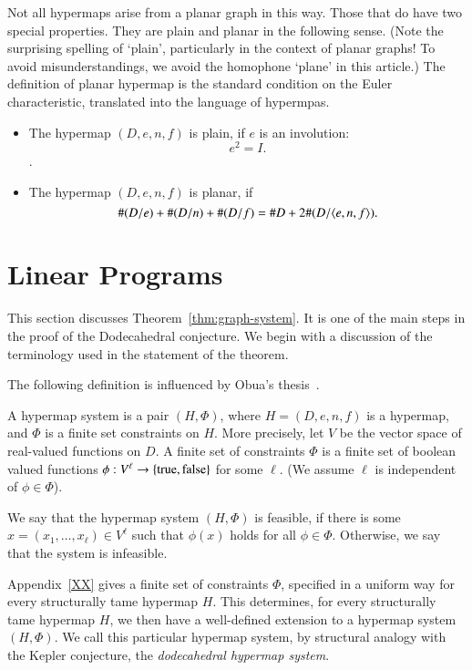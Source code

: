 Not all hypermaps arise from a planar graph in this way.
Those that do have two special properties.  They are plain
and planar in the following sense.  (Note the surprising spelling
of `plain', particularly in the context of planar graphs!  
To avoid misunderstandings, 
we avoid the homophone `plane' in this article.)  The definition
of planar hypermap is the standard condition on the Euler
characteristic, translated into the language of hypermpas.

\begin{definition}\label{def:plain}

\begin{itemize}
\item The hypermap $(D,e,n,f)$ is plain, if $e$ is an involution:
$$
 e^2 = I.
$$.
\item The hypermap $(D,e,n,f)$ is planar, if
   $$
   \#(D/e) + \#(D/n) + \#(D/f) = \# D + 2\#(D/\langle e,n,f\rangle).
   $$
\end{itemize}
\end{definition}



\section{Linear Programs}

This section discusses Theorem~\ref{thm:graph-system}.  It is one of
the main steps in the proof of the Dodecahedral conjecture.
We begin with a discussion of the terminology used in the
statement of the theorem.

The following definition is influenced by Obua's thesis~\cite{Ob}.

\begin{definition} A hypermap system is a pair $(H,\Phi)$,
where $H=(D,e,n,f)$ is a hypermap, and $\Phi$ is a finite set constraints on $H$.  More precisely, let $V$ be the vector space of
real-valued functions on $D$.  A finite set of constraints $\Phi$ is a finite
set of boolean valued functions $\phi:V^\ell\to \{{\operatorname{true}},{\operatorname{false}}\}$
for some $\ell$. (We assume $\ell$ is independent of $\phi\in \Phi$).
\end{definition}

We say that the hypermap system $(H,\Phi)$ is feasible, if
there is some $x=(x_1,\ldots,x_\ell)\in V^\ell$ such that
$\phi(x)$ holds for all $\phi\in\Phi$. Otherwise, we say that
the system is infeasible.

Appendix~\ref{XX} gives a finite set of constraints $\Phi$, 
specified
in a uniform way for every structurally tame hypermap $H$.  This determines,
for every structurally tame hypermap $H$, we then have a well-defined extension
to a hypermap system $(H,\Phi)$.  We call this particular hypermap
system, by structural analogy with the Kepler conjecture,
the {\it dodecahedral hypermap system}.  


